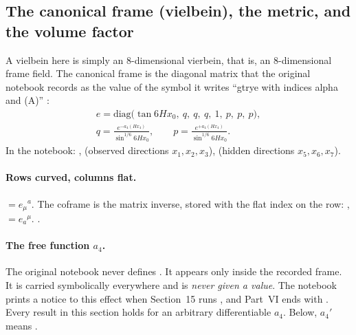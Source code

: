 \subsection{The canonical frame (vielbein), the metric, and the volume factor}
\label{csc:frame}\label{sec:6.3}

A vielbein here is simply an 8-dimensional vierbein, that is, an 8-dimensional frame field. The
canonical frame is the diagonal matrix that the original notebook records as the value of the
symbol it writes ``gtrye with indices alpha and (A)'' :
\begin{gather}
  e=\mathrm{diag}\bigl(\tan 6Hx_0,\ q,\ q,\ q,\ 1,\ p,\ p,\ p\bigr),\\
  q=\frac{e^{-a_4(Hx_4)}}{\sin^{1/6}6Hx_0},\qquad
  p=\frac{e^{+a_4(Hx_4)}}{\sin^{1/6}6Hx_0}.
\end{gather}
In the notebook: ,
 (observed directions $x_1,x_2,x_3$),  (hidden directions
$x_5,x_6,x_7$).

\paragraph{Rows curved, columns flat.}  $=e_\mu{}^a$. The
coframe is the matrix inverse, stored with the flat index on the row:
, 
$=e_a{}^\mu$. 
.

\paragraph{The free function \texorpdfstring{$a_4$}{a4}.} The original notebook never defines
. It appears only inside the recorded frame. It is carried symbolically everywhere and
is \emph{never given a value}. The notebook prints a notice to this effect when Section~15 runs
, and Part~VI ends with 
.
Every result in this section holds for an arbitrary differentiable $a_4$. Below, $a_4'$ means
.

